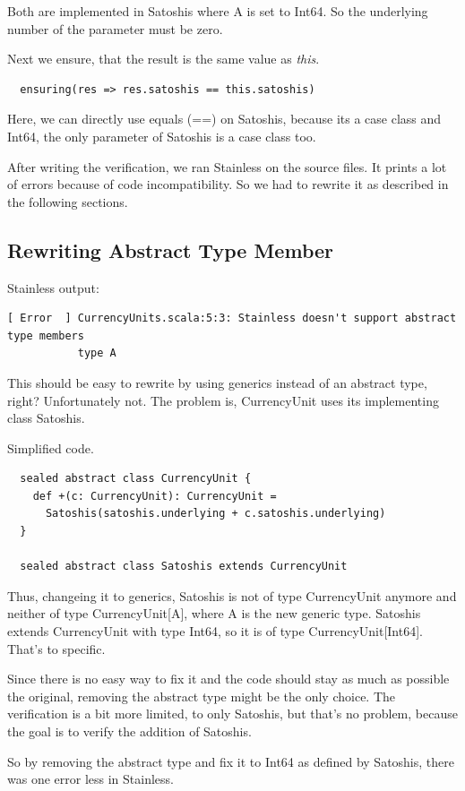 Both are implemented in Satoshis where A is set to Int64.
So the underlying number of the parameter must be zero.

Next we ensure, that the result is the same value as \emph{this}.
\begin{lstlisting}
  ensuring(res => res.satoshis == this.satoshis)
\end{lstlisting}
Here, we can directly use equals (==) on Satoshis, because its a case class and Int64, the only parameter of Satoshis is a case class too.

After writing the verification, we ran Stainless on the source files.
It prints a lot of errors because of code incompatibility.
So we had to rewrite it as described in the following sections.

\subsection{Rewriting Abstract Type Member}
Stainless output:
\begin{lstlisting}
[ Error  ] CurrencyUnits.scala:5:3: Stainless doesn't support abstract type members
           type A
\end{lstlisting}
This should be easy to rewrite by using generics instead of an abstract type, right?
Unfortunately not.
The problem is, CurrencyUnit uses its implementing class Satoshis.

Simplified code.
\begin{lstlisting}
  sealed abstract class CurrencyUnit {
    def +(c: CurrencyUnit): CurrencyUnit =
      Satoshis(satoshis.underlying + c.satoshis.underlying)
  }

  sealed abstract class Satoshis extends CurrencyUnit
\end{lstlisting}
Thus, changeing it to generics, Satoshis is not of type CurrencyUnit anymore and neither of type CurrencyUnit[A], where A is the new generic type.
Satoshis extends CurrencyUnit with type Int64, so it is of type CurrencyUnit[Int64].
That's to specific.

Since there is no easy way to fix it and the code should stay as much as possible the original, removing the abstract type might be the only choice.
The verification is a bit more limited, to only Satoshis, but that's no problem, because the goal is to verify the addition of Satoshis.

So by removing the abstract type and fix it to Int64 as defined by Satoshis, there was one error less in Stainless.

